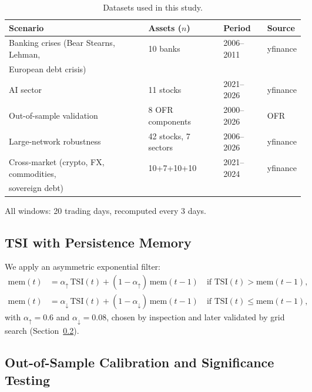 \documentclass[11pt,a4paper]{article}
\begin{document}
\begin{table}[ht]
\centering
\caption{Datasets used in this study.}
\label{tab:data}
\begin{tabular}{llll}
\toprule
Scenario & Assets ($n$) & Period & Source \\
\midrule
Banking crises (Bear Stearns, Lehman, & 10 banks & 2006--2011 & yfinance \\
European debt crisis) & & & \\
AI sector & 11 stocks & 2021--2026 & yfinance \\
Out-of-sample validation & 8 OFR components & 2000--2026 & OFR \\
Large-network robustness & 42 stocks, 7 sectors & 2006--2026 & yfinance \\
Cross-market (crypto, FX, commodities, & 10+7+10+10 & 2021--2024 & yfinance \\
sovereign debt) & & & \\
\bottomrule
\end{tabular}
\end{table}

All windows: 20 trading days, recomputed every 3 days.


\subsection{TSI with Persistence Memory}
\label{sec:mem}

We apply an asymmetric exponential filter:
\begin{align}
\mathrm{mem}(t) &= \alpha_{\uparrow}\,\mathrm{TSI}(t) +
  (1-\alpha_{\uparrow})\,\mathrm{mem}(t-1)
  \quad \text{if } \mathrm{TSI}(t) > \mathrm{mem}(t-1), \label{eq:mem_up}\\
\mathrm{mem}(t) &= \alpha_{\downarrow}\,\mathrm{TSI}(t) +
  (1-\alpha_{\downarrow})\,\mathrm{mem}(t-1)
  \quad \text{if } \mathrm{TSI}(t) \leq \mathrm{mem}(t-1), \label{eq:mem_down}
\end{align}
with $\alpha_{\uparrow} = 0.6$ and $\alpha_{\downarrow} = 0.08$, chosen
by inspection and later validated by grid search (Section~\ref{sec:oos}).


\subsection{Out-of-Sample Calibration and Significance Testing}
\label{sec:oos}
\end{document}
